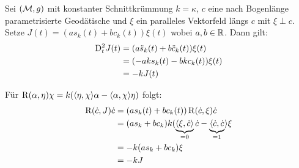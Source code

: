 \begin{bsp}
    Sei $(\mathcal{M}, g)$ mit konstanter Schnittkrümmung $k=\kappa$, $c$ eine nach 
    Bogenlänge parametrisierte Geodätische und $\xi$ ein paralleles Vektorfeld längs $c$
    mit $\xi \perp c$.
    Setze $J(t) = (a s_k(t) + b c_k(t)) \xi(t)$ wobei $a, b \in \mathbb{R}$.
    Dann gilt:
\begin{align*}
\mathrm{D}^2_t J(t) &= (a \ddot{s}_k (t) + b \ddot{c}_k (t)) \xi (t)\\
&= (- a k s_k (t) - b k c_k (t)) \xi (t) \\
&= -k J(t)
\end{align*}

Für $\operatorname{R} (\alpha, \eta) \chi = k ( \langle \eta, \chi \rangle \alpha
- \langle \alpha ,\chi\rangle \eta)$ folgt:
\begin{align*}
\operatorname{R} (\dot{c}, J) \dot{c} &= (a s_k (t) + b c_k(t))\operatorname{R} (\dot{c}, \xi) \dot{c}\\
&= (as_k + bc_k)k (\underbrace{\langle\xi,\dot{c}\rangle}_{=0}\dot{c}
- \underbrace{\langle\dot{c},\dot{c}}_{=1}\rangle \xi\\
&= -k(as_k + bc_k)\xi\\
&= - k J
\end{align*}
\end{bsp}




